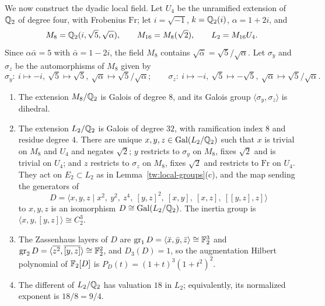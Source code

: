 We now construct the dyadic local field. Let $U_4$ be the
unramified extension of $\mathbb Q_2$ of degree four, with Frobenius $\mathrm{Fr}$;
let $i=\sqrt{-1}$, $k=\mathbb Q_2(i)$, $\alpha=1+2i$, and
\[
 M_8=\mathbb Q_2(i,\sqrt5,\sqrt\alpha),\qquad M_{16}=M_8(\sqrt2),\qquad
 L_2=M_{16}U_4 .
\]
Since $\alpha\bar\alpha=5$ with $\bar\alpha=1-2i$, the field $M_8$ contains
$\sqrt{\bar\alpha}=\sqrt5/\sqrt\alpha$. Let $\sigma_y$ and $\sigma_z$ be the
automorphisms of $M_8$ given by
\[
 \sigma_y:\ i\mapsto-i,\ \sqrt5\mapsto\sqrt5,\ \sqrt\alpha\mapsto\sqrt5/\sqrt\alpha;
 \qquad
 \sigma_z:\ i\mapsto-i,\ \sqrt5\mapsto-\sqrt5,\ \sqrt\alpha\mapsto\sqrt5/\sqrt\alpha.
\]

\begin{lemma}\label{tw:local-two}
\begin{enumerate}
\item[(a)] The extension $M_8/\mathbb Q_2$ is Galois of degree $8$, and its Galois
 group $\langle\sigma_y,\sigma_z\rangle$ is dihedral.
\item[(b)] The extension $L_2/\mathbb Q_2$ is Galois of degree $32$, with
 ramification index $8$ and residue degree $4$. There are unique
 $x,y,z\in\operatorname{Gal}(L_2/\mathbb Q_2)$ such that $x$ is trivial on $M_8$ and $U_4$ and
 negates $\sqrt2$; $y$ restricts to $\sigma_y$ on $M_8$, fixes $\sqrt2$ and
 is trivial on $U_4$; and $z$ restricts to $\sigma_z$ on $M_8$, fixes $\sqrt2$
 and restricts to $\mathrm{Fr}$ on $U_4$. They act on $E_2\subset L_2$ as in
 Lemma~\ref{tw:local-groups}(c), and the map sending the generators of
 \[
  D=\langle x,y,z\mid x^2,\ y^2,\ z^4,\ [y,z]^2,\ [x,y],\ [x,z],\ [[y,z],z]\rangle
 \]
 to $x,y,z$ is an isomorphism $D\cong\operatorname{Gal}(L_2/\mathbb Q_2)$. The inertia group is
 $\langle x,y,[y,z]\rangle\cong C_2^3$.
\item[(c)] The Zassenhaus layers of $D$ are
 $\operatorname{gr}_1D=\langle\bar x,\bar y,\bar z\rangle\cong\mathbb F_2^3$ and
 $\operatorname{gr}_2D=\langle\overline{z^2},\overline{[y,z]}\rangle\cong\mathbb F_2^2$,
 and $D_3(D)=1$, so the augmentation Hilbert polynomial of $\mathbb F_2[D]$ is
 $P_D(t)=(1+t)^3(1+t^2)^2$.
\item[(d)] The different of $L_2/\mathbb Q_2$ has valuation $18$ in $L_2$;
 equivalently, its normalized exponent is $18/8=9/4$.
\end{enumerate}
\end{lemma}

